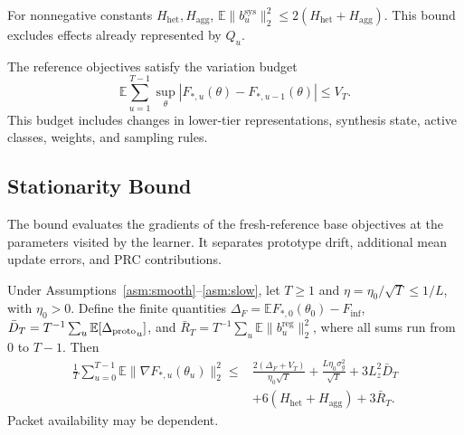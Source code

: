 \begin{assumption}
\label{asm:het_agg}
For nonnegative constants $H_{\mathrm{het}},H_{\mathrm{agg}}$,
$\mathbb E\|b_u^{\mathrm{sys}}\|_2^2
\le2(H_{\mathrm{het}}+H_{\mathrm{agg}})$.
This bound excludes effects already represented by $Q_u$.
\end{assumption}

\begin{assumption}
\label{asm:slow}
The reference objectives satisfy the variation budget
\begin{equation}
 \mathbb E\sum_{u=1}^{T-1}\sup_\theta
 |F_{*,u}(\theta)-F_{*,u-1}(\theta)|\le V_T .
 \label{eq:reference_variation}
\end{equation}
This budget includes changes in lower-tier representations, synthesis state, active classes, weights, and sampling rules.
\end{assumption}

\subsection{Stationarity Bound}

The bound evaluates the gradients of the fresh-reference base objectives at the parameters visited by the learner. It separates prototype drift, additional mean update errors, and PRC contributions.

\begin{theorem}
\label{thm:convergence}
Under Assumptions~\ref{asm:smooth}--\ref{asm:slow}, let
$T\ge1$ and $\eta=\eta_0/\sqrt T\le1/L$, with $\eta_0>0$.
Define the finite quantities
$\Delta_F=\mathbb E F_{*,0}(\theta_0)-F_{\inf}$,
$\bar D_T=T^{-1}\sum_u\mathbb E[{\Delta_{\mathrm{proto}}}_u]$, and
$\bar R_T=T^{-1}\sum_u\mathbb E\|b_u^{\mathrm{reg}}\|_2^2$,
where all sums run from $0$ to $T-1$. Then
\begin{equation}
\begin{split}
 \frac1T\sum_{u=0}^{T-1}
 \mathbb E\|\nabla F_{*,u}(\theta_u)\|_2^2
 \le{}&\frac{2(\Delta_F+V_T)}{\eta_0\sqrt T}+\frac{L\eta_0\sigma_g^2}{\sqrt T}
 +3L_z^2\bar D_T\\
 &+6(H_{\mathrm{het}}+H_{\mathrm{agg}})
 +3\bar R_T .
\end{split}
\label{eq:main_bound}
\end{equation}
Packet availability may be dependent.
\end{theorem}


